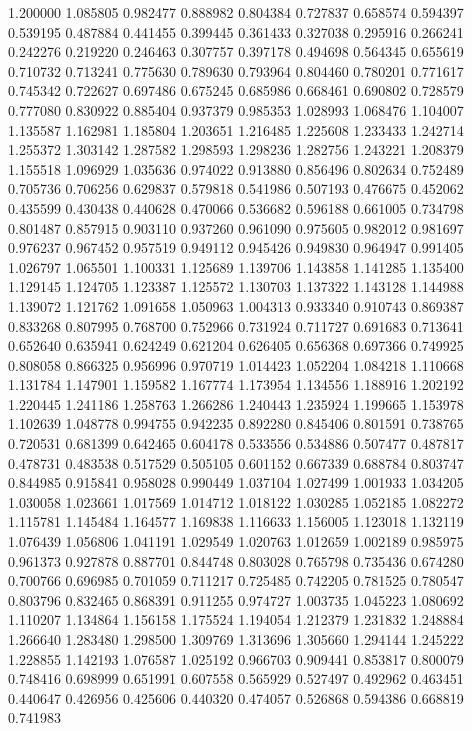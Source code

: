 1.200000
1.085805
0.982477
0.888982
0.804384
0.727837
0.658574
0.594397
0.539195
0.487884
0.441455
0.399445
0.361433
0.327038
0.295916
0.266241
0.242276
0.219220
0.246463
0.307757
0.397178
0.494698
0.564345
0.655619
0.710732
0.713241
0.775630
0.789630
0.793964
0.804460
0.780201
0.771617
0.745342
0.722627
0.697486
0.675245
0.685986
0.668461
0.690802
0.728579
0.777080
0.830922
0.885404
0.937379
0.985353
1.028993
1.068476
1.104007
1.135587
1.162981
1.185804
1.203651
1.216485
1.225608
1.233433
1.242714
1.255372
1.303142
1.287582
1.298593
1.298236
1.282756
1.243221
1.208379
1.155518
1.096929
1.035636
0.974022
0.913880
0.856496
0.802634
0.752489
0.705736
0.706256
0.629837
0.579818
0.541986
0.507193
0.476675
0.452062
0.435599
0.430438
0.440628
0.470066
0.536682
0.596188
0.661005
0.734798
0.801487
0.857915
0.903110
0.937260
0.961090
0.975605
0.982012
0.981697
0.976237
0.967452
0.957519
0.949112
0.945426
0.949830
0.964947
0.991405
1.026797
1.065501
1.100331
1.125689
1.139706
1.143858
1.141285
1.135400
1.129145
1.124705
1.123387
1.125572
1.130703
1.137322
1.143128
1.144988
1.139072
1.121762
1.091658
1.050963
1.004313
0.933340
0.910743
0.869387
0.833268
0.807995
0.768700
0.752966
0.731924
0.711727
0.691683
0.713641
0.652640
0.635941
0.624249
0.621204
0.626405
0.656368
0.697366
0.749925
0.808058
0.866325
0.956996
0.970719
1.014423
1.052204
1.084218
1.110668
1.131784
1.147901
1.159582
1.167774
1.173954
1.134556
1.188916
1.202192
1.220445
1.241186
1.258763
1.266286
1.240443
1.235924
1.199665
1.153978
1.102639
1.048778
0.994755
0.942235
0.892280
0.845406
0.801591
0.738765
0.720531
0.681399
0.642465
0.604178
0.533556
0.534886
0.507477
0.487817
0.478731
0.483538
0.517529
0.505105
0.601152
0.667339
0.688784
0.803747
0.844985
0.915841
0.958028
0.990449
1.037104
1.027499
1.001933
1.034205
1.030058
1.023661
1.017569
1.014712
1.018122
1.030285
1.052185
1.082272
1.115781
1.145484
1.164577
1.169838
1.116633
1.156005
1.123018
1.132119
1.076439
1.056806
1.041191
1.029549
1.020763
1.012659
1.002189
0.985975
0.961373
0.927878
0.887701
0.844748
0.803028
0.765798
0.735436
0.674280
0.700766
0.696985
0.701059
0.711217
0.725485
0.742205
0.781525
0.780547
0.803796
0.832465
0.868391
0.911255
0.974727
1.003735
1.045223
1.080692
1.110207
1.134864
1.156158
1.175524
1.194054
1.212379
1.231832
1.248884
1.266640
1.283480
1.298500
1.309769
1.313696
1.305660
1.294144
1.245222
1.228855
1.142193
1.076587
1.025192
0.966703
0.909441
0.853817
0.800079
0.748416
0.698999
0.651991
0.607558
0.565929
0.527497
0.492962
0.463451
0.440647
0.426956
0.425606
0.440320
0.474057
0.526868
0.594386
0.668819
0.741983
